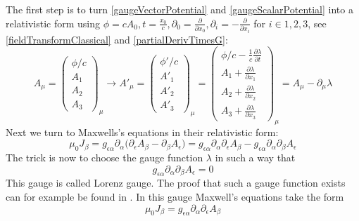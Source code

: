 \documentclass{article}
\begin{document}
The first step is to turn \ref{gaugeVectorPotential} and \ref{gaugeScalarPotential} into a relativistic form using $\phi=c A_0, t=\frac{x_0}{c}, \partial_0 = \frac{\partial}{\partial x_0}, \partial_i = - \frac{\partial}{\partial x_i}$ for $i \in {1,2,3}$, see \ref{fieldTransformClassical} and \ref{partialDerivTimesG}:
\begin{equation}
  A_\mu = \left(\begin{array}{c}
                      \phi /c
                      \\
                      A_1
                      \\
                      A_2
                      \\
                      A_3
          \end{array} \right)_\mu
  \rightarrow
  A'_\mu = \left(\begin{array}{c}
                                \phi' /c
                                \\
                                A'_1
                                \\
                                A'_2
                                \\
                                A'_3
  \end{array} \right)_\mu
  =
  \left(\begin{array}{c}
          \phi /c - \frac{1}{c} \frac{\partial \lambda}{\partial t}
          \\
          A_1 + \frac{\partial \lambda}{\partial x_1}
          \\
          A_2 + \frac{\partial \lambda}{\partial x_2}
          \\
          A_3 + \frac{\partial \lambda}{\partial x_3}
  \end{array} \right)_\mu
  =
  A_\mu - \partial_\mu \lambda
\end{equation}
Next we turn to Maxwells's equations in their relativistic form:
\begin{equation}
  \mu_0 J_\beta = g_{\epsilon\alpha}  \partial_\alpha \big(\partial_\epsilon A_\beta - \partial_\beta A_\epsilon \big)
  = g_{\epsilon\alpha} \partial_\alpha \partial_\epsilon A_\beta - g_{\epsilon\alpha} \partial_\alpha \partial_\beta A_\epsilon
\end{equation}
The trick is now to choose the gauge function $\lambda$ in such a way that
\begin{equation}
  g_{\epsilon\alpha} \partial_\alpha \partial_\beta A_\epsilon = 0
\end{equation}
This gauge is called Lorenz gauge.
The proof that such a gauge function exists can for example be found in \cite{JacksonLorentzGauge}.
In this gauge Maxwell's equations take the form
\begin{equation}
  \mu_0 J_\beta = g_{\epsilon\alpha} \partial_\alpha \partial_\epsilon A_\beta
\end{equation}
\end{document}
